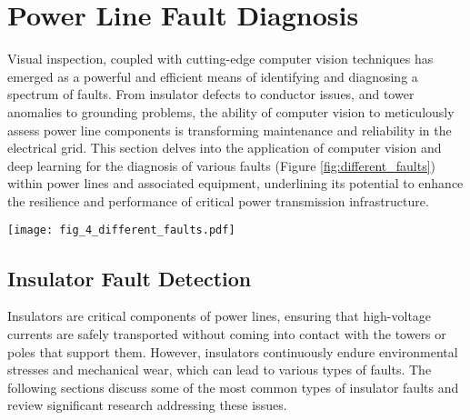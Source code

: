 \section{Power Line Fault Diagnosis}\label{sec:fault}
Visual inspection, coupled with cutting-edge computer vision techniques has emerged as a powerful and efficient means of identifying and diagnosing a spectrum of faults. From insulator defects to conductor issues, and tower anomalies to grounding problems, the ability of computer vision to meticulously assess power line components is transforming maintenance and reliability in the electrical grid. This section delves into the application of computer vision and deep learning for the diagnosis of various faults (Figure \ref{fig:different_faults}) within power lines and associated equipment, underlining its potential to enhance the resilience and performance of critical power transmission infrastructure.

\begin{figure*}[htb]
    \centering
    \texttt{[image: fig\_4\_different\_faults.pdf]}
    \caption{Different types of power line faults \cite{liu_data_2020}.}
    \label{fig:different_faults}
\end{figure*}

\subsection{Insulator Fault Detection}
Insulators are critical components of power lines, ensuring that high-voltage currents are safely transported without coming into contact with the towers or poles that support them. However, insulators continuously endure environmental stresses and mechanical wear, which can lead to various types of faults. The following sections discuss some of the most common types of insulator faults and review significant research addressing these issues.

